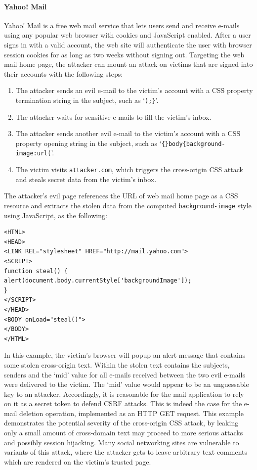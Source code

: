 \documentclass{acm_proc_article-sp}
\begin{document}
\paragraph{Yahoo! Mail} Yahoo! Mail is a free web mail service that lets users send and receive e-mails using any popular web browser with cookies and JavaScript enabled. After a user signs in with a valid account, the web site will authenticate the user with browser session cookies for as long as two weeks without signing out. Targeting the web mail home page, the attacker can mount an attack on victims that are signed into their accounts with the following steps:
\begin{enumerate}
\item{The attacker sends an evil e-mail to the victim's account with a CSS property termination string in the subject, such as `\texttt{);\}}'.}
\item{The attacker waits for sensitive e-mails to fill the victim's inbox.}
\item{The attacker sends another evil e-mail to the victim's account with a CSS property opening string in the subject, such as `\texttt{\{\}body\{background-image:url(}'.}
\item{The victim visits \texttt{attacker.com}, which triggers the cross-origin CSS attack and steals secret data from the victim's inbox.}
\end{enumerate}
The attacker's evil page references the URL of web mail home page as a CSS resource and extracts the stolen data from the computed \texttt{background-image} style using JavaScript, as the following:
\begin{verbatim}
<HTML>
<HEAD>
<LINK REL="stylesheet" HREF="http://mail.yahoo.com">
<SCRIPT>
function steal() {
alert(document.body.currentStyle['backgroundImage']);
}
</SCRIPT>
</HEAD>
<BODY onLoad="steal()">
</BODY>
</HTML>
\end{verbatim}
In this example, the victim's browser will popup an alert message that contains some stolen cross-origin text. Within the stolen text contains the subjects, senders and the `mid' value for all e-mails received between the two evil e-mails were delivered to the victim. The `mid' value would appear to be an unguessable key to an attacker. Accordingly, it is reasonable for the mail application to rely on it as a secret token to defend CSRF attacks. This is indeed the case for the e-mail deletion operation, implemented as an HTTP GET request. This example demonstrates the potential severity of the cross-origin CSS attack, by leaking only a small amount of cross-domain text may proceed to more serious attacks and possibly session hijacking. Many social networking sites are vulnerable to variants of this attack, where the attacker gets to leave arbitrary text comments which are rendered on the victim's trusted page.
\end{document}
